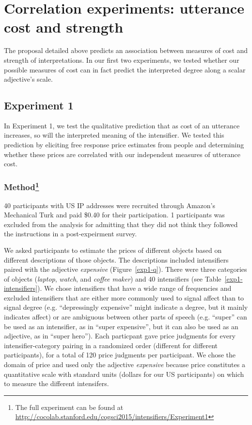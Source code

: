 \documentclass[10pt,letterpaper]{article}
\newcommand{\w}[1]{\emph{#1}}
\begin{document}
\section{Correlation experiments: utterance cost and strength}
The proposal detailed above predicts an association between measures of cost and strength of interpretations. In our first two experiments, we tested whether our possible measures of cost can in fact predict the interpreted degree along a scalar adjective's scale.

\subsection{Experiment 1}

In Experiment 1, we test the qualitative prediction that as cost of an utterance increases, so will the interpreted meaning of the intensifier.
We tested this prediction
by eliciting free response price estimates from people and determining whether these prices are correlated with our independent measures of utterance cost.

\subsubsection{Method\footnote{The full experiment can be found at \url{http://cocolab.stanford.edu/cogsci2015/intensifiers/Experiment1}}}

40 participants with US IP addresses were recruited through Amazon's Mechanical Turk and paid \$0.40 for their participation. 1 participants was excluded from the analysis for admitting that they did not think they followed the instructions in a post-expeirment survey.

We asked participants to estimate the prices of different objects based on different descriptions of those objects. The descriptions included intensifiers paired with the adjective \w{expensive} (Figure~\ref{exp1-q}).
There were three categories of objects (\emph{laptop}, \emph{watch}, and \emph{coffee maker}) and 40 intensifiers (see Table~\ref{exp1-intensifiers}).
We chose intensifiers that have a wide range of frequencies and excluded intensifiers that are either more commonly used to signal affect than to signal degree (e.g. ``depressingly expensive'' might indicate a degree, but it mainly indicates affect) or are ambiguous between other parts of speech (e.g. ``super'' can be used as an intensifier, as in ``super expensive'', but it can also be used as an adjective, as in ``super hero'').
Each particpant gave price judgments for every intensifier-category pairing in a randomized order (different for different participants), for a total of 120 price judgments per participant.
We chose the domain of price and used only the adjective \w{expensive} because price constitutes a quantitative scale with standard units (dollars for our US participants) on which to measure the different intensifers.
\end{document}
